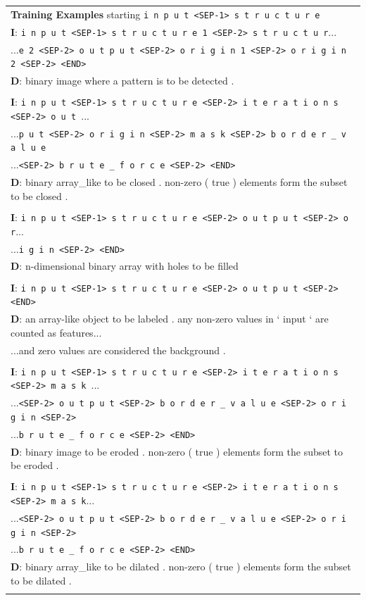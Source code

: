 \begin{table}
\begin{center}
{\begin{tabular}{l}
\textbf{Training Examples} starting \texttt{i n p u t <SEP-1> s t r u c t u r e}\\
\textbf{I}: \texttt{i n p u t <SEP-1> s t r u c t u r e 1 <SEP-2> s t r u c t u r}...\\
...\texttt{e 2 <SEP-2> o u t p u t <SEP-2> o r i g i n 1 <SEP-2> o r i g i n 2 <SEP-2> <END>}\\
\textbf{D}: binary image where a pattern is to be detected .\\
\\
\textbf{I}: \texttt{i n p u t <SEP-1> s t r u c t u r e <SEP-2> i t e r a t i o n s <SEP-2> o u t }...\\
...\texttt{p u t <SEP-2> o r i g i n <SEP-2> m a s k <SEP-2> b o r d e r _ v a l u e }\\
...\texttt{<SEP-2> b r u t e _ f o r c e <SEP-2> <END>}\\
\textbf{D}: binary array\_like to be closed . non-zero ( true ) elements form the subset to be closed .\\
\\
\textbf{I}: \texttt{i n p u t <SEP-1> s t r u c t u r e <SEP-2> o u t p u t <SEP-2> o r}...\\
...\texttt{i g i n <SEP-2> <END>}\\
\textbf{D}: n-dimensional binary array with holes to be filled\\
\\
\textbf{I}: \texttt{i n p u t <SEP-1> s t r u c t u r e <SEP-2> o u t p u t <SEP-2> <END>}\\
\textbf{D}: an array-like object to be labeled . any non-zero values in ` input ` are counted as features...\\
...and zero values are considered the background .\\
\\
\textbf{I}: \texttt{i n p u t <SEP-1> s t r u c t u r e <SEP-2> i t e r a t i o n s <SEP-2> m a s k }...\\
...\texttt{<SEP-2> o u t p u t <SEP-2> b o r d e r _ v a l u e <SEP-2> o r i g i n <SEP-2>}\\
...\texttt{b r u t e _ f o r c e <SEP-2> <END>}\\
\textbf{D}: binary image to be eroded . non-zero ( true ) elements form the subset to be eroded .\\
\\
\textbf{I}: \texttt{i n p u t <SEP-1> s t r u c t u r e <SEP-2> i t e r a t i o n s <SEP-2> m a s k}...\\
...\texttt{<SEP-2> o u t p u t <SEP-2> b o r d e r _ v a l u e <SEP-2> o r i g i n <SEP-2>}\\
...\texttt{b r u t e _ f o r c e <SEP-2> <END>}\\
\textbf{D}: binary array\_like to be dilated . non-zero ( true ) elements form the subset to be dilated .\\
\\




\end{tabular}}
\end{center}
\end{table}
